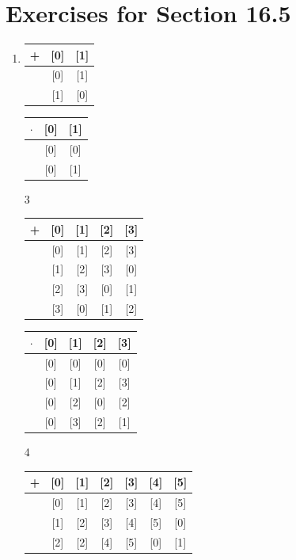 \documentclass[12pt]{article}
\begin{document}
\section*{Exercises for Section 16.5}
\begin{enumerate}
	\item 
	    \begin{tabular}{c|c|c}
		\hline
		+ & [0] & [1]\\
		\hline
		[0] & [0] & [1]\\
		\hline
		[1] & [1] & [0]\\
		\hline
	    \end{tabular}
	    \begin{tabular}{c|c|c}
		\hline
		$\cdot$ & [0] & [1]\\
		\hline
		[0] & [0] & [0]\\
		\hline
		[1] & [0] & [1]\\
		\hline
	    \end{tabular}
	\item [3]
	    \begin{tabular}{c|c|c|c|c}
		\hline
		+ & [0] & [1] & [2] & [3]\\
		\hline
		[0] & [0] & [1] & [2] & [3]\\
		\hline
		[1] & [1] & [2] & [3] & [0]\\
		\hline
		[2] & [2] & [3] & [0] & [1]\\
		\hline
		[3] & [3] & [0] & [1] & [2]\\
		\hline
	    \end{tabular}
	    \begin{tabular}{c|c|c|c|c}
		\hline
		$\cdot$ & [0] & [1] & [2] & [3]\\
		\hline
		[0] & [0] & [0] & [0] & [0]\\
		\hline
		[1] & [0] & [1] & [2] & [3]\\
		\hline
		[2] & [0] & [2] & [0] & [2]\\
		\hline
		[3] & [0] & [3] & [2] & [1]\\
	    \end{tabular}
	\item [4]
	    \begin{tabular}{c|c|c|c|c|c|c}
		\hline
		+ & [0] & [1] & [2] & [3] & [4] & [5]\\
		\hline
		[0] & [0] & [1] & [2] & [3] & [4] & [5]\\
		\hline
		[1] & [1] & [2] & [3] & [4] & [5] & [0]\\
		\hline
		[2] & [2] & [2] & [4] & [5] & [0] & [1]\\

\end{tabular}
\end{enumerate}
\end{document}

